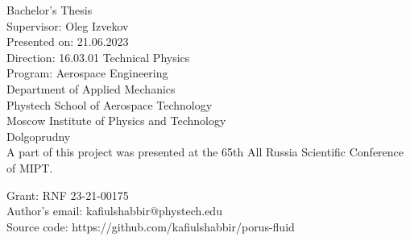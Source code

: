 Bachelor's Thesis \\
Supervisor: Oleg Izvekov \\
Presented on: 21.06.2023 \\

Direction: 16.03.01 Technical Physics \\
Program: Aerospace Engineering \\
Department of Applied Mechanics \\
Phystech School of Aerospace Technology \\ 
Moscow Institute of Physics and Technology \\ 
Dolgoprudny \\

A part of this project was presented at the 65th All Russia Scientific Conference of MIPT.

Grant: RNF 23-21-00175 \\
Author's email: kafiulshabbir@phystech.edu \\
Source code: https://github.com/kafiulshabbir/porus-fluid
